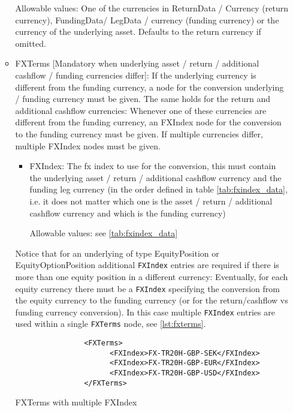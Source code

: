 \begin{itemize}
\begin{itemize}
    Allowable values: One of the currencies in ReturnData / Currency (return currency), FundingData/ LegData / currency
    (funding currency) or the currency of the underlying asset. Defaults to the return currency if omitted.

  \item FXTerms [Mandatory when underlying asset / return / additional cashflow / funding currencies differ]: If the
    underlying currency is different from the funding currency, a node for the conversion underlying / funding currency
    must be given. The same holds for the return and additional cashflow currencies: Whenever one of these currencies
    are different from the funding currency, an FXIndex node for the conversion to the funding currency must be given. If multiple currencies differ, 
    multiple FXIndex nodes must be given.

    \begin{itemize}
    \item FXIndex: The fx index to use for the conversion, this must contain the underlying asset / return / additional cashflow
      currency and the funding leg currency (in the order defined in table \ref{tab:fxindex_data}, i.e. it does not
      matter which one is the asset / return / additional cashflow currency and which is the funding currency)
        
        Allowable values: see \ref{tab:fxindex_data}
    \end{itemize}

    Notice that for an underlying of type EquityPosition or EquityOptionPosition additional \verb+FXIndex+
    entries are required if there is more than one equity position in a different currency: Eventually, for each equity currency there must be a \verb+FXIndex+ specifying the
    conversion from the equity currency to the funding currency (or for the return/cashflow vs funding currency conversion). In this case multiple \verb+FXIndex+ entries are used within a single \lstinline!FXTerms! node, see \ref{lst:fxterms}. 
    
    
        \begin{listing}[H]
\begin{verbatim}
                <FXTerms>
                      <FXIndex>FX-TR20H-GBP-SEK</FXIndex>
                      <FXIndex>FX-TR20H-GBP-EUR</FXIndex>
                      <FXIndex>FX-TR20H-GBP-USD</FXIndex>
                </FXTerms>
\end{verbatim}
\caption{FXTerms with multiple FXIndex}
\label{lst:fxterms}
\end{listing}


\end{itemize}
\end{itemize}
